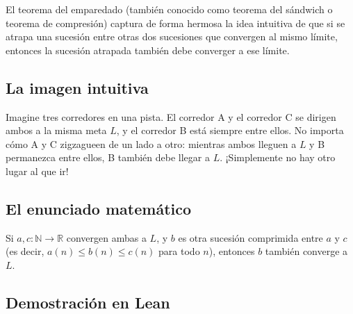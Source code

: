El teorema del emparedado (también conocido como teorema del sándwich o
teorema de compresión) captura de forma hermosa la idea intuitiva de que si
se atrapa una sucesión entre otras dos sucesiones que convergen al mismo
límite, entonces la sucesión atrapada también debe converger a ese límite.

\subsection{La imagen intuitiva}

Imagine tres corredores en una pista. El corredor A y el corredor C se
dirigen ambos a la misma meta $L$, y el corredor B está siempre entre
ellos. No importa cómo A y C zigzagueen de un lado a otro: mientras ambos
lleguen a $L$ y B permanezca entre ellos, B también debe llegar a $L$.
¡Simplemente no hay otro lugar al que ir!

\subsection{El enunciado matemático}

\begin{theorem}
Si $a, c : \mathbb{N} \to \mathbb{R}$ convergen ambas a $L$, y $b$ es otra
sucesión comprimida entre $a$ y $c$ (es decir, $a(n) \leq b(n) \leq c(n)$
para todo $n$), entonces $b$ también converge a $L$.
\end{theorem}

\subsection{Demostración en Lean}

